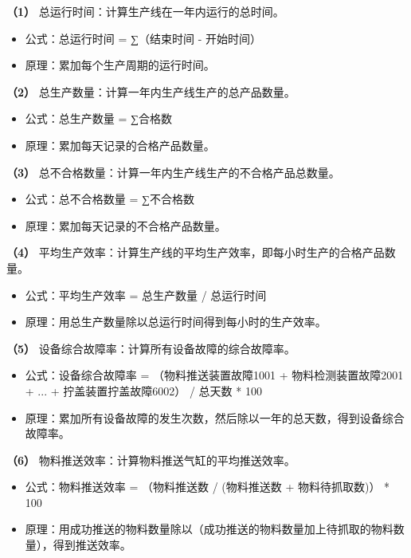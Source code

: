 \documentclass[withoutpreface,bwprint]{cumcmthesis}
\begin{document}
\textbf{（1）} 总运行时间：计算生产线在一年内运行的总时间。

\begin{itemize}
    \item 公式：总运行时间 = ∑（结束时间 - 开始时间）
    \item 原理：累加每个生产周期的运行时间。
\end{itemize}

\textbf{（2）} 总生产数量：计算一年内生产线生产的总产品数量。

\begin{itemize}
    \item 公式：总生产数量 = ∑合格数
    \item 原理：累加每天记录的合格产品数量。
\end{itemize}

\textbf{（3）} 总不合格数量：计算一年内生产线生产的不合格产品总数量。

\begin{itemize}
    \item 公式：总不合格数量 = ∑不合格数
    \item 原理：累加每天记录的不合格产品数量。
\end{itemize}

\textbf{（4）} 平均生产效率：计算生产线的平均生产效率，即每小时生产的合格产品数量。

\begin{itemize}
    \item 公式：平均生产效率 = 总生产数量 / 总运行时间
    \item 原理：用总生产数量除以总运行时间得到每小时的生产效率。
\end{itemize}

\textbf{（5）} 设备综合故障率：计算所有设备故障的综合故障率。

\begin{itemize}
    \item 公式：设备综合故障率 = （物料推送装置故障1001 + 物料检测装置故障2001 + ... + 拧盖装置拧盖故障6002） / 总天数 * 100%
    \item 原理：累加所有设备故障的发生次数，然后除以一年的总天数，得到设备综合故障率。
\end{itemize}

\textbf{（6）} 物料推送效率：计算物料推送气缸的平均推送效率。

\begin{itemize}
    \item 公式：物料推送效率 = （物料推送数 / (物料推送数 + 物料待抓取数)） * 100%
    \item 原理：用成功推送的物料数量除以（成功推送的物料数量加上待抓取的物料数量），得到推送效率。
\end{itemize}
\end{document}
